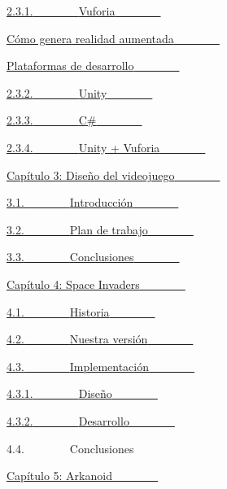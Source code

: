 \documentclass[]{article}
\begin{document}
\hyperref[h.lnxbz9]{2.3.1.}\hyperref[h.lnxbz9]{~~~~~~~~}\hyperref[h.lnxbz9]{Vuforia}\hyperref[h.lnxbz9]{~~~~~~~~}

\hyperref[h.35nkun2]{Cómo genera realidad
aumentada}\hyperref[h.35nkun2]{~~~~~~~~}

\hyperref[h.1ksv4uv]{Plataformas de
desarrollo}\hyperref[h.1ksv4uv]{~~~~~~~~}

\hyperref[h.44sinio]{2.3.2.}\hyperref[h.44sinio]{~~~~~~~~}\hyperref[h.44sinio]{Unity}\hyperref[h.44sinio]{~~~~~~~~}

\hyperref[h.2jxsxqh]{2.3.3.}\hyperref[h.2jxsxqh]{~~~~~~~~}\hyperref[h.2jxsxqh]{C\#}\hyperref[h.2jxsxqh]{~~~~~~~~}

\hyperref[h.z337ya]{2.3.4.}\hyperref[h.z337ya]{~~~~~~~~}\hyperref[h.z337ya]{Unity
+ Vuforia}\hyperref[h.z337ya]{~~~~~~~~}

\hyperref[h.3j2qqm3]{Capítulo 3: Diseño del
videojuego}\hyperref[h.3j2qqm3]{~~~~~~~~}

\hyperref[h.1y810tw]{3.1.}\hyperref[h.1y810tw]{~~~~~~~~}\hyperref[h.1y810tw]{Introducción}\hyperref[h.1y810tw]{~~~~~~~~}

\hyperref[h.4i7ojhp]{3.2.}\hyperref[h.4i7ojhp]{~~~~~~~~}\hyperref[h.4i7ojhp]{Plan
de trabajo}\hyperref[h.4i7ojhp]{~~~~~~~~}

\hyperref[h.2xcytpi]{3.3.}\hyperref[h.2xcytpi]{~~~~~~~~}\hyperref[h.2xcytpi]{Conclusiones}\hyperref[h.2xcytpi]{~~~~~~~~}

\hyperref[h.1ci93xb]{Capítulo 4: Space
Invaders}\hyperref[h.1ci93xb]{~~~~~~~~}

\hyperref[h.3whwml4]{4.1.}\hyperref[h.3whwml4]{~~~~~~~~}\hyperref[h.3whwml4]{Historia}\hyperref[h.3whwml4]{~~~~~~~~}

\hyperref[h.2bn6wsx]{4.2.}\hyperref[h.2bn6wsx]{~~~~~~~~}\hyperref[h.2bn6wsx]{Nuestra
versión}\hyperref[h.2bn6wsx]{~~~~~~~~}

\hyperref[h.qsh70q]{4.3.}\hyperref[h.qsh70q]{~~~~~~~~}\hyperref[h.qsh70q]{Implementación}\hyperref[h.qsh70q]{~~~~~~~~}

\hyperref[h.3as4poj]{4.3.1.}\hyperref[h.3as4poj]{~~~~~~~~}\hyperref[h.3as4poj]{Diseño}\hyperref[h.3as4poj]{~~~~~~~~}

\hyperref[h.1pxezwc]{4.3.2.}\hyperref[h.1pxezwc]{~~~~~~~~}\hyperref[h.1pxezwc]{Desarrollo}\hyperref[h.1pxezwc]{~~~~~~~~}

4.4.~~~~~~~~Conclusiones~~~~~~~~

\hyperref[h.2p2csry]{Capítulo 5: Arkanoid}\hyperref[h.2p2csry]{~~~~~~~~}
\end{document}
